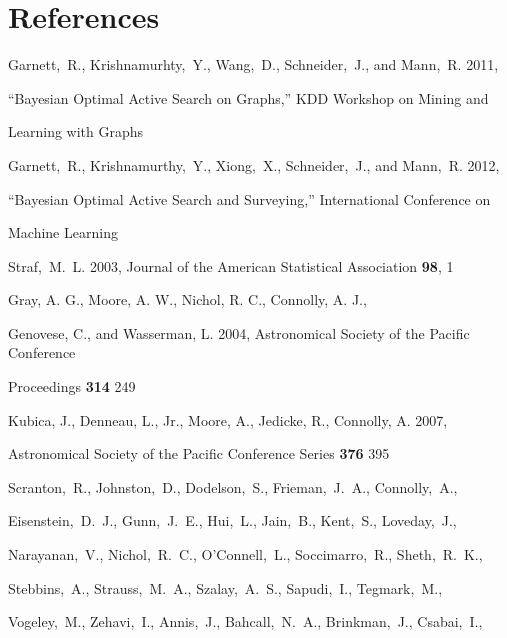 \documentclass[prd,nofootbib,floatfix,11pt,tightenlines,nofootinbib]{revtex4}
\begin{document}
\newpage


\section{References}
\begin{thebibliography}{99}

Garnett,~R., Krishnamurhty,~Y., Wang,~D., Schneider,~J., and Mann,~R. 2011,

``Bayesian Optimal Active Search on Graphs,'' KDD Workshop on Mining and

Learning with Graphs




Garnett,~R., Krishnamurthy,~Y., Xiong,~X., Schneider,~J., and Mann,~R. 2012,

``Bayesian Optimal Active Search and Surveying,'' International Conference on

Machine Learning




Straf,~M.~L. 2003, Journal of the American Statistical Association {\bf 98}, 1




Gray, A. G., Moore, A. W., Nichol, R. C., Connolly, A. J.,

Genovese, C., and Wasserman, L. 2004, Astronomical Society of the Pacific Conference

Proceedings {\bf 314} 249




Kubica, J., Denneau, L., Jr., Moore, A., Jedicke, R., Connolly, A. 2007,

Astronomical Society of the Pacific Conference Series {\bf 376} 395




Scranton,~R., Johnston,~D., Dodelson,~S., Frieman,~J.~A., Connolly,~A.,

Eisenstein,~D.~J., Gunn,~J.~E., Hui,~L., Jain,~B., Kent,~S., Loveday,~J.,

Narayanan,~V., Nichol,~R.~C., O'Connell,~L., Soccimarro,~R., Sheth,~R.~K.,

Stebbins,~A., Strauss,~M.~A., Szalay,~A.~S., Sapudi,~I., Tegmark,~M.,

Vogeley,~M., Zehavi,~I., Annis,~J., Bahcall,~N.~A., Brinkman,~J., Csabai,~I.,


\end{thebibliography}
\end{document}
